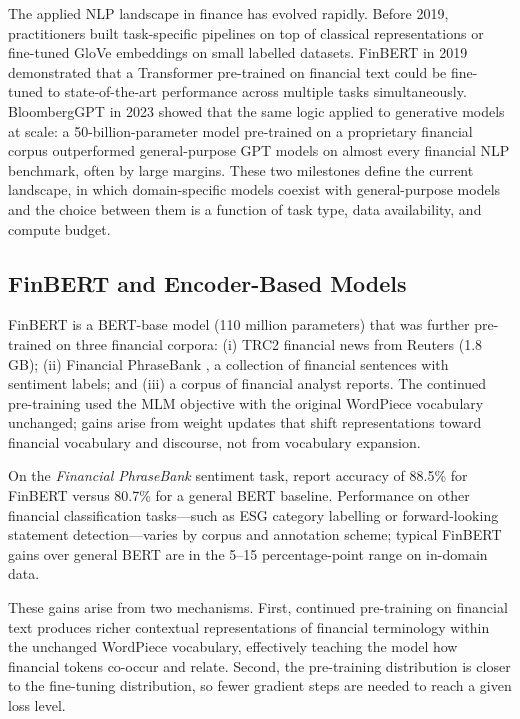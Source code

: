 \begin{context}
The applied NLP landscape in finance has evolved rapidly.  Before 2019,
practitioners built task-specific pipelines on top of classical representations
or fine-tuned GloVe embeddings on small labelled datasets.  FinBERT in 2019
demonstrated that a Transformer pre-trained on financial text could be fine-tuned
to state-of-the-art performance across multiple tasks simultaneously.
BloombergGPT in 2023 showed that the same logic applied to generative models
at scale: a 50-billion-parameter model pre-trained on a proprietary financial
corpus outperformed general-purpose GPT models on almost every financial NLP
benchmark, often by large margins.  These two milestones define the current
landscape, in which domain-specific models coexist with general-purpose models
and the choice between them is a function of task type, data availability,
and compute budget.

\subsection{FinBERT and Encoder-Based Models}
\label{subsec:finbert}

FinBERT \cite{yang2020finbert} is a BERT-base model (110 million parameters)
that was further pre-trained on three financial corpora: (i) TRC2 financial
news from Reuters (1.8\,GB); (ii) Financial PhraseBank \cite{malo2014financial},
a collection of financial sentences with sentiment labels; and (iii) a corpus
of financial analyst reports.  The continued pre-training used the MLM objective
with the original WordPiece vocabulary unchanged; gains arise from weight updates
that shift representations toward financial vocabulary and discourse, not from
vocabulary expansion.

On the \emph{Financial PhraseBank} sentiment task, \citet{yang2020finbert} report accuracy of 88.5\% for FinBERT versus 80.7\% for a general BERT baseline. Performance on other financial classification tasks---such as ESG category labelling or forward-looking statement detection---varies by corpus and annotation scheme; typical FinBERT gains over general BERT are in the 5--15 percentage-point range on in-domain data.

These gains arise from two mechanisms.  First, continued pre-training on
financial text produces richer contextual representations of financial
terminology within the unchanged WordPiece vocabulary, effectively teaching
the model how financial tokens co-occur and relate.  Second, the pre-training
distribution is closer to the fine-tuning distribution, so fewer gradient
steps are needed to reach a given loss level.


\end{context}
